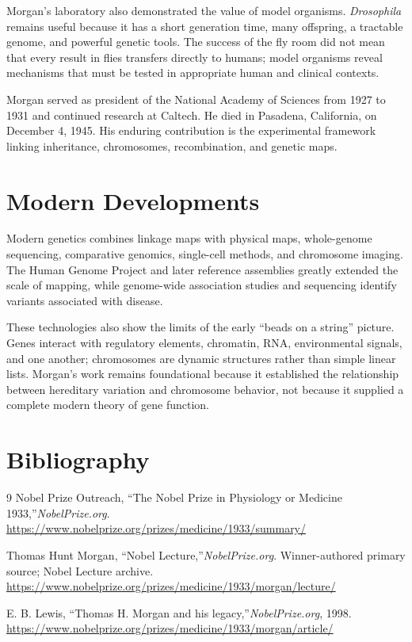 Morgan's laboratory also demonstrated the value of model organisms. \emph{Drosophila} remains useful because it has a short generation time, many offspring, a tractable genome, and powerful genetic tools. The success of the fly room did not mean that every result in flies transfers directly to humans; model organisms reveal mechanisms that must be tested in appropriate human and clinical contexts.

Morgan served as president of the National Academy of Sciences from 1927 to 1931 and continued research at Caltech. He died in Pasadena, California, on December 4, 1945. His enduring contribution is the experimental framework linking inheritance, chromosomes, recombination, and genetic maps.

\section{Modern Developments}

Modern genetics combines linkage maps with physical maps, whole-genome sequencing, comparative genomics, single-cell methods, and chromosome imaging. The Human Genome Project and later reference assemblies greatly extended the scale of mapping, while genome-wide association studies and sequencing identify variants associated with disease.

These technologies also show the limits of the early ``beads on a string'' picture. Genes interact with regulatory elements, chromatin, RNA, environmental signals, and one another; chromosomes are dynamic structures rather than simple linear lists. Morgan's work remains foundational because it established the relationship between hereditary variation and chromosome behavior, not because it supplied a complete modern theory of gene function.

\section{Bibliography}

\begin{thebibliography}{9}
Nobel Prize Outreach, ``The Nobel Prize in Physiology or Medicine 1933,''\emph{NobelPrize.org}.\newline
\url{https://www.nobelprize.org/prizes/medicine/1933/summary/}

Thomas Hunt Morgan, ``Nobel Lecture,''\emph{NobelPrize.org}. Winner-authored primary source; Nobel Lecture archive.\newline
\url{https://www.nobelprize.org/prizes/medicine/1933/morgan/lecture/}

E. B. Lewis, ``Thomas H. Morgan and his legacy,''\emph{NobelPrize.org}, 1998.\newline
\url{https://www.nobelprize.org/prizes/medicine/1933/morgan/article/}
\end{thebibliography}
